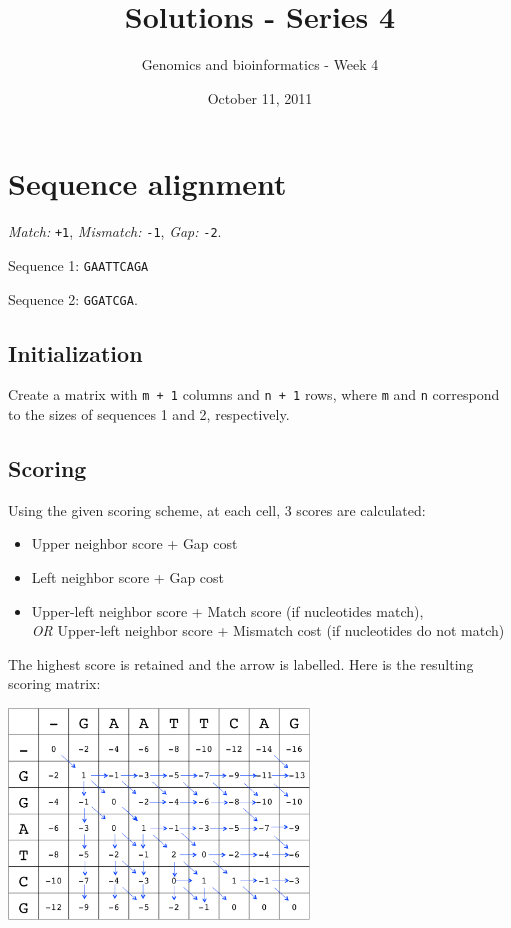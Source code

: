 \documentclass[english, a4paper,11pt]{article}
\title{Solutions - Series 4}
\date{October 11, 2011}
\author{Genomics and bioinformatics - Week 4}
\begin{document}
\maketitle





\section{Sequence alignment}
\emph{Match:}  \texttt{+1}, \emph{Mismatch:} \texttt{-1}, \emph{Gap:} \texttt{-2}.

Sequence 1: \texttt{GAATTCAGA}

Sequence 2: \texttt{GGATCGA}.

\subsection{Initialization}
Create a matrix with \texttt{m + 1} columns and \texttt{n + 1} rows, where \texttt{m} and \texttt{n} correspond to the sizes of sequences 1 and 2, respectively.

\subsection{Scoring}
Using the given scoring scheme, at each cell, 3 scores are calculated:
\begin{itemize}
\item Upper neighbor score + Gap cost
\item Left neighbor score + Gap cost
\item Upper-left neighbor score + Match score (if nucleotides match), \\
\emph{OR} Upper-left neighbor score + Mismatch cost (if nucleotides do not match)
\end{itemize}
The highest score is retained and the arrow is labelled. Here is the resulting scoring matrix: \\
\begin{center}
\includegraphics[width=0.6\textwidth]{scoring.png}\\
\end{center}
\end{document}
